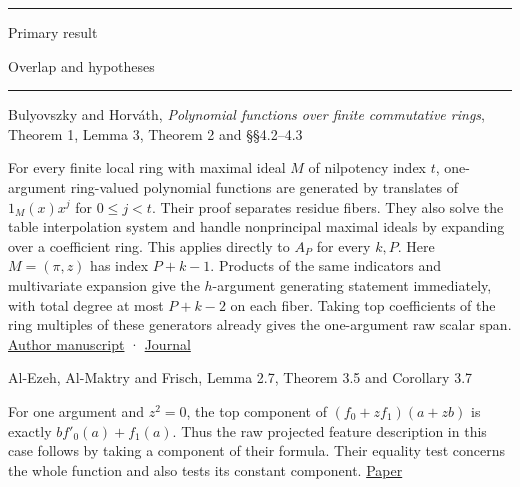 \documentclass[11pt,a4paper]{article}
\newlength{\OfflineResearchTableWidth}
\newcommand{\OfflineResearchHeaderRule}{\noindent\rule{\linewidth}{0.45pt}\par}
\newcommand{\OfflineResearchRow}{\par}
\newenvironment{OfflineResearchTable}{%
  \par\medskip\begingroup\small\setlength{\parindent}{0pt}%
  \setlength{\parskip}{3pt plus 1pt minus .5pt}%
  \setlength{\OfflineResearchTableWidth}{\linewidth}%
}{%
  \par\endgroup\medskip%
}
\begin{document}
\begin{OfflineResearchTable}
\OfflineResearchHeaderRule
\noindent%
\begin{minipage}[t]{0.27405\OfflineResearchTableWidth}\raggedright
Primary result
\end{minipage}\hfill%
\begin{minipage}[t]{0.67095\OfflineResearchTableWidth}\raggedright
Overlap and hypotheses
\end{minipage}%
\OfflineResearchRow
\nobreak
\OfflineResearchHeaderRule
\nobreak
\noindent%
\begin{minipage}[t]{0.27405\OfflineResearchTableWidth}\raggedright
Bulyovszky and Horváth, \emph{Polynomial functions over finite
commutative rings}, Theorem 1, Lemma 3, Theorem 2 and §§4.2--4.3
\end{minipage}\hfill%
\begin{minipage}[t]{0.67095\OfflineResearchTableWidth}\raggedright
For
every finite local ring with maximal ideal \(M\) of nilpotency index
\(t\), one-argument ring-valued polynomial functions are generated by
translates of \(1_M(x)x^j\) for \(0\le j<t\). Their proof separates
residue fibers. They also solve the table interpolation system and
handle nonprincipal maximal ideals by expanding over a coefficient ring.
This applies directly to \(A_P\) for every \(k,P\). Here \(M=(\pi,z)\)
has index \(P+k-1\). Products of the same indicators and multivariate
expansion give the \(h\)-argument generating statement immediately, with
total degree at most \(P+k-2\) on each fiber. Taking top coefficients of
the ring multiples of these generators already gives the one-argument
raw scalar span.
\href{https://riemann.math.unideb.hu/~ghorvath/publications/BuHo.pdf}{Author
manuscript} ·
\href{https://doi.org/10.1016/j.tcs.2017.09.002}{Journal}
\end{minipage}%
\OfflineResearchRow
\noindent%
\begin{minipage}[t]{0.27405\OfflineResearchTableWidth}\raggedright
Al-Ezeh, Al-Maktry and Frisch, Lemma 2.7, Theorem 3.5 and Corollary 3.7
\end{minipage}\hfill%
\begin{minipage}[t]{0.67095\OfflineResearchTableWidth}\raggedright
For one argument and \(z^2=0\), the top component of
\((f_0+zf_1)(a+zb)\) is exactly \(bf'_0(a)+f_1(a)\). Thus the raw
projected feature description in this case follows by taking a component
of their formula. Their equality test concerns the whole function and
also tests its constant component.
\href{https://arxiv.org/pdf/1910.00238}{Paper}

\end{minipage}
\end{OfflineResearchTable}
\end{document}

